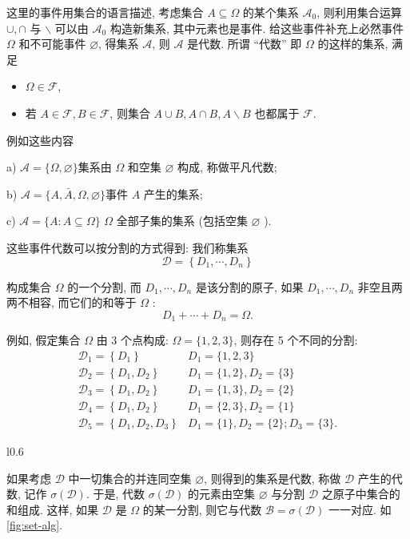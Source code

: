 这里的事件用集合的语言描述, 考虑集合 $A \subseteq \Omega$ 的某个集系 $\mathscr{A}_0$, 则利用集合运算 $\cup, \cap$ 与 $\backslash$ 可以由 $\mathscr{A}_0$ 构造新集系, 其中元素也是事件. 给这些事件补充上必然事件 $\Omega$ 和不可能事件 $\varnothing$, 得集系 $\mathscr{A}$, 则 $\mathcal{A}$ 是代数. 所谓 “代数” 即 $\Omega$ 的这样的集系, 满足
\begin{itemize}
    \item [1)] $\Omega \in \mathcal{F}$,
    \item    [2)] 若 $A \in \mathcal{F}, B \in \mathcal{F}$, 则集合 $A \cup B, A \cap B, A \backslash B$ 也都属于 $\mathcal{F}$.
\end{itemize}

例如这些内容
\begin{example}
    a) $\mathscr{A}=\{\Omega, \varnothing\}$集系由 $\Omega$ 和空集 $\varnothing$ 构成, 称做平凡代数;

b) $\mathscr{A}=\{A, \bar{A}, \Omega, \varnothing\}$事件 $A$ 产生的集系;

c) $\mathscr{A}=\{A: A \subseteq \Omega\}$ $\Omega$ 全部子集的集系 (包括空集 $\varnothing$ ).
\end{example}

这些事件代数可以按分割的方式得到: 我们称集系
$$
\mathscr{D}=\left\{D_1, \cdots, D_n\right\}
$$

构成集合 $\Omega$ 的一个分割, 而 $D_1, \cdots, D_n$ 是该分割的原子, 如果 $D_1, \cdots, D_n$ 非空且两两不相容, 而它们的和等于 $\Omega$ :
$$
D_1+\cdots+D_n=\Omega .
$$

例如, 假定集合 $\Omega$ 由 3 个点构成: $\Omega=\{1,2,3\}$, 则存在 5 个不同的分割:
$$
\begin{array}{ll}
\mathscr{D}_1=\left\{D_1\right\} & D_1=\{1,2,3\} \\
\mathscr{D}_2=\left\{D_1, D_2\right\} & D_1=\{1,2\}, D_2=\{3\} \\
\mathscr{D}_3=\left\{D_1, D_2\right\} & D_1=\{1,3\}, D_2=\{2\} \\
\mathscr{D}_4=\left\{D_1, D_2\right\} & D_1=\{2,3\}, D_2=\{1\} \\
\mathscr{D}_5=\left\{D_1, D_2, D_3\right\} & D_1=\{1\}, D_2=\{2\} ; D_3=\{3\} .
\end{array}
$$

\begin{wrapfigure}{l}{0.6\textwidth}
     
    \caption{集合代数}
    \label{fig:set-alg}
\end{wrapfigure}

如果考虑 $\mathscr{D}$ 中一切集合的并连同空集 $\varnothing$, 则得到的集系是代数, 称做 $\mathscr{D}$ 产生的代数, 记作 $\sigma(\mathscr{D})$. 于是, 代数 $\sigma(\mathscr{D})$ 的元素由空集 $\varnothing$ 与分割 $\mathscr{D}$ 之原子中集合的和组成.
这样, 如果 $\mathscr{D}$ 是 $\Omega$ 的某一分割, 则它与代数 $\mathscr{B}=\sigma(\mathscr{D})$ 一一对应. 如\cref{fig:set-alg}.



